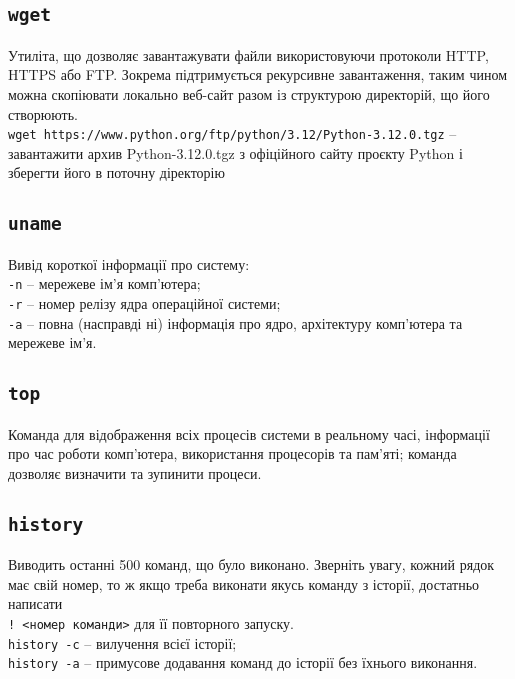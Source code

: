 \documentclass[10pt,a4paper]{fancyhandout}
\begin{document}
\subsection{\texttt{wget}}
Утиліта, що дозволяє завантажувати файли використовуючи протоколи HTTP, HTTPS або FTP. Зокрема підтримується рекурсивне завантаження, таким чином можна скопіювати локально веб-сайт разом із структурою директорій, що його створюють. \\
\texttt{wget https://www.python.org/ftp/python/3.12/Python-3.12.0.tgz} -- завантажити архив Python-3.12.0.tgz з офіційного сайту проєкту Python і зберегти його в поточну діректорію
\goodbreak

\subsection{\texttt{uname}}
Вивід короткої інформації про систему: \\
\texttt{-n} -- мережеве ім'я комп'ютера; \\
\texttt{-r} -- номер релізу ядра операційної системи; \\
\texttt{-a} -- повна (насправді ні) інформація про ядро, архітектуру комп'ютера та мережеве ім'я.
\goodbreak

\subsection{\texttt{top}}
Команда для відображення всіх процесів системи в реальному часі, інформації про час роботи комп'ютера, використання процесорів та пам'яті; команда дозволяє визначити та зупинити процеси. 
\goodbreak

\subsection{\texttt{history}}
Виводить останні 500 команд, що було виконано. Зверніть увагу, кожний рядок має свій номер, то ж якщо треба виконати якусь команду з історії, достатньо написати \\
\texttt{! <номер команди>} для її повторного запуску. \\
\texttt{history -c} -- вилучення всієї історії; \\
\texttt{history -a} -- примусове додавання команд до історії без їхнього виконання.
\goodbreak
\end{document}
